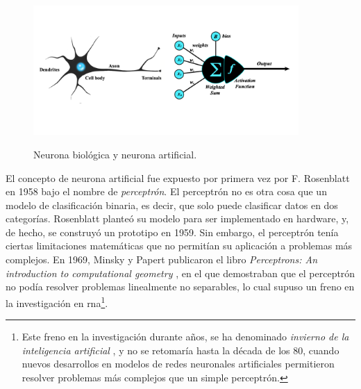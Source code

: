 \begin{figure}[H]
    \caption[Neurona biológica y neurona artificial]{Neurona biológica y neurona artificial.}
    \centering
    \includegraphics[width=0.9\textwidth]{./figuras/perceptron_with_neuron.png}
    \label{fig:neurona_artificial_natural}
\end{figure}

El concepto de neurona artificial fue expuesto por primera vez por F. Rosenblatt en 1958 \citep{rothmanTransformersNaturalLanguage2021} bajo el nombre de \emph{perceptrón}. El perceptrón no es otra cosa que un modelo de clasificación binaria, es decir, que solo puede clasificar datos en dos categorías. Rosenblatt planteó su modelo para ser implementado en hardware, y, de hecho, se construyó un prototipo en 1959. Sin embargo, el perceptrón tenía ciertas limitaciones matemáticas que no permitían su aplicación a problemas más complejos. En 1969, Minsky y Papert publicaron el libro \emph{Perceptrons: An introduction to computational geometry} \citep{minsky1969perceptrons}, en el que demostraban que el perceptrón no podía resolver problemas linealmente no separables, lo cual supuso un freno en la investigación en \gls{rna}\footnote{Este freno en la investigación durante años, se ha denominado \emph{invierno de la inteligencia artificial} \citep{InviernoIA2023}, y no se retomaría hasta la década de los 80, cuando nuevos desarrollos en modelos de redes neuronales artificiales permitieron resolver problemas más complejos que un simple perceptrón.}.

